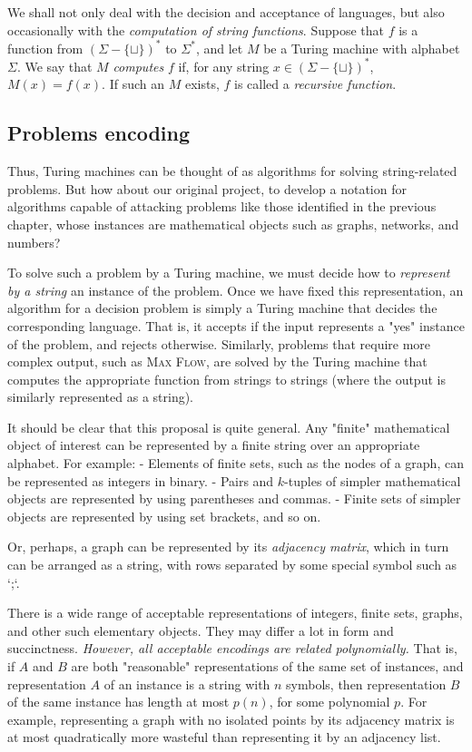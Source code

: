 \documentclass[12pt]{article}
\begin{document}
\begin{defbox}
     We shall not only deal with the decision and acceptance of languages, but also occasionally with the \textit{computation of string functions}. Suppose that $f$ is a function from $(\Sigma - \{\sqcup\})^*$ to $\Sigma^*$, and let $M$ be a Turing machine with alphabet $\Sigma$. We say that $M$ \textit{computes} $f$ if, for any string $x \in (\Sigma - \{\sqcup\})^*$, $M(x) = f(x)$. If such an $M$ exists, $f$ is called a \textit{recursive function}.
\end{defbox}

\subsection{Problems encoding}
Thus, Turing machines can be thought of as algorithms for solving string-related problems. But how about our original project, to develop a notation for algorithms capable of attacking problems like those identified in the previous chapter, whose instances are mathematical objects such as graphs, networks, and numbers? 

To solve such a problem by a Turing machine, we must decide how to \textit{represent by a string} an instance of the problem. Once we have fixed this representation, an algorithm for a decision problem is simply a Turing machine that decides the corresponding language. That is, it accepts if the input represents a "yes" instance of the problem, and rejects otherwise. Similarly, problems that require more complex output, such as \textsc{Max Flow}, are solved by the Turing machine that computes the appropriate function from strings to strings (where the output is similarly represented as a string).

It should be clear that this proposal is quite general. Any "finite" mathematical object of interest can be represented by a finite string over an appropriate alphabet. For example:
- Elements of finite sets, such as the nodes of a graph, can be represented as integers in binary.
- Pairs and $k$-tuples of simpler mathematical objects are represented by using parentheses and commas.
- Finite sets of simpler objects are represented by using set brackets, and so on.

Or, perhaps, a graph can be represented by its \textit{adjacency matrix}, which in turn can be arranged as a string, with rows separated by some special symbol such as `;`.

There is a wide range of acceptable representations of integers, finite sets, graphs, and other such elementary objects. They may differ a lot in form and succinctness. \textit{However, all acceptable encodings are related polynomially.} That is, if $A$ and $B$ are both "reasonable" representations of the same set of instances, and representation $A$ of an instance is a string with $n$ symbols, then representation $B$ of the same instance has length at most $p(n)$, for some polynomial $p$. For example, representing a graph with no isolated points by its adjacency matrix is at most quadratically more wasteful than representing it by an adjacency list.
\end{document}
